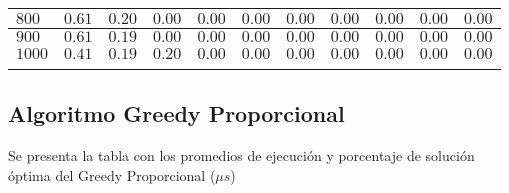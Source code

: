 \documentclass[12pt]{article}
\begin{document}
\begin{tabu}{|@{}*{11}{p{1.4cm}@{}|}}
$800$ & $0.61$ & $0.20$ & $0.00$ & $0.00$ & $0.00$ & $0.00$ & $0.00$ & $0.00$ & $0.00$ & $0.00$ \\\hline
$900$ & $0.61$ & $0.19$ & $0.00$ & $0.00$ & $0.00$ & $0.00$ & $0.00$ & $0.00$ & $0.00$ & $0.00$ \\\hline
$1000$ & $0.41$ & $0.19$ & $0.20$ & $0.00$ & $0.00$ & $0.00$ & $0.00$ & $0.00$ & $0.00$ & $0.00$ \\\hline
{}%
\end{tabu}
\pagebreak
\subsection*{Algoritmo Greedy Proporcional}
Se presenta la tabla con los promedios de ejecuci\'on y porcentaje de soluci\'on \'optima del Greedy Proporcional ($\mu s$)\\
\end{document}
